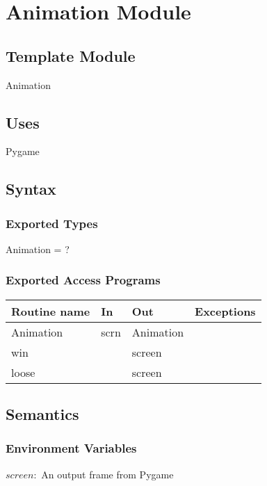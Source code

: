 \documentclass[12pt]{article}
\begin{document}
\newpage

\section {Animation Module}

\subsection{Template Module}

Animation

\subsection {Uses}

Pygame

\subsection {Syntax}

\subsubsection {Exported Types}

Animation = ?

\subsubsection {Exported Access Programs}

\begin{tabular}{| l | l | l | l |}
\hline
\textbf{Routine name} & \textbf{In} & \textbf{Out} & \textbf{Exceptions}\\
\hline
Animation & scrn & Animation & ~\\ 
\hline
win & ~ & screen & ~\\ 
\hline
loose & ~ & screen & ~\\
\hline
\end{tabular}

\subsection {Semantics}

\subsubsection {Environment Variables}

$screen:$ An output frame from Pygame
\end{document}
